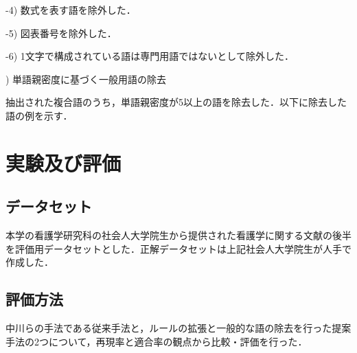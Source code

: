 \documentclass[japanese]{jnlp_1.4}
\begin{document}
\vspace{1zw}
\vspace{1zw}

-4) 数式を表す語を除外した．

\vspace{1zw}
\vspace{1zw}

-5) 図表番号を除外した．

\vspace{1zw}
\vspace{1zw}

-6) 1文字で構成されている語は専門用語ではないとして除外した．

) 単語親密度に基づく一般用語の除去

抽出された複合語のうち，単語親密度が5以上の語を除去した．以下に除去した語の例を示す．

\vspace{1zw}
\vspace{1zw}



\section{実験及び評価}

\subsection{データセット}

本学の看護学研究科の社会人大学院生から提供された看護学に関する文献の後半を評価用データセットとした．正解データセットは上記社会人大学院生が人手で作成した．

\subsection{評価方法}

中川らの手法である従来手法と，ルールの拡張と一般的な語の除去を行った提案手法の2つについて，再現率と適合率の観点から比較・評価を行った．
\end{document}
